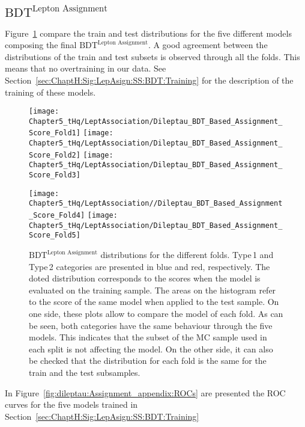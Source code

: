 \subsection{$\text{BDT}^{\text{Lepton Assignment}}$}
\label{sec:BDT:AdditionalMaterial:Assignment}
Figure~\ref{fig:dileptau:Assignment_appendix:ScoreDistributions} compare the train and test
distributions for the five different models composing the final $\text{BDT}^{\text{Lepton Assignment}}$.
A good agreement between the distributions of the train and test subsets is observed through all
the folds. This means that no overtraining in our data.
See Section~\ref{sec:ChaptH:Sig:LepAsign:SS:BDT:Training} for the description
of the training of these models.

\begin{figure}[h]
\centering
\texttt{[image: Chapter5\_tHq/LeptAssociation/Dileptau\_BDT\_Based\_Assignment\_Score\_Fold1]}\quad
\texttt{[image: Chapter5\_tHq/LeptAssociation/Dileptau\_BDT\_Based\_Assignment\_Score\_Fold2]}
\medskip
\texttt{[image: Chapter5\_tHq/LeptAssociation/Dileptau\_BDT\_Based\_Assignment\_Score\_Fold3]}\quad

\texttt{[image: Chapter5\_tHq/LeptAssociation//Dileptau\_BDT\_Based\_Assignment\_Score\_Fold4]}
\medskip
\texttt{[image: Chapter5\_tHq/LeptAssociation/Dileptau\_BDT\_Based\_Assignment\_Score\_Fold5]}
\caption{$\text{BDT}^{\text{Lepton Assignment}}$ distributions for the different folds.
 Type$\,$1 and Type$\,$2 categories are presented in blue and red, respectively.
The doted distribution corresponds to the scores when the model is evaluated on the
training sample. The areas on the histogram refer to the score of the same model when
applied to the test sample. 
On one side, these plots allow to compare the model of each fold. As can be seen,
both categories have the same behaviour through the five models. This indicates
that the subset of the MC sample used in each split is not affecting the model.
On the other side, it can also be checked that the distribution for each fold
is the same for the train and the test subsamples.}
\label{fig:dileptau:Assignment_appendix:ScoreDistributions}
\end{figure}

In Figure~\ref{fig:dileptau:Assignment_appendix:ROCs} are presented the ROC curves for the five models
trained in Section~\ref{sec:ChaptH:Sig:LepAsign:SS:BDT:Training}
 

